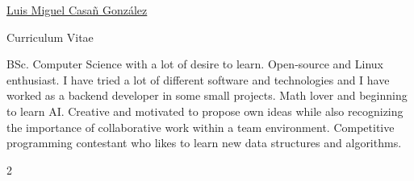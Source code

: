 \documentclass[10pt]{curriculum}
\begin{document}
\begin{center}
	{\href{https://linkedin.com/in/luis-miguel-casañ-1b4a05207}{ \sffamily\Huge Luis Miguel Casañ González}}
	
	\medskip
	
	{\Huge{Curriculum Vitae}}
\end{center}

BSc. Computer Science with a lot of desire to learn. Open‑source and Linux enthusiast. I have tried a
lot of different software and technologies and I have worked as a backend developer in some small projects. Math lover and beginning to learn AI. Creative and motivated to propose own ideas while also recognizing the importance of collaborative work within a team environment. Competitive programming contestant who likes to learn new data structures and algorithms.
\begin{paracol}{2} %


%	
%	
%	
%	







\end{paracol}
\end{document}
